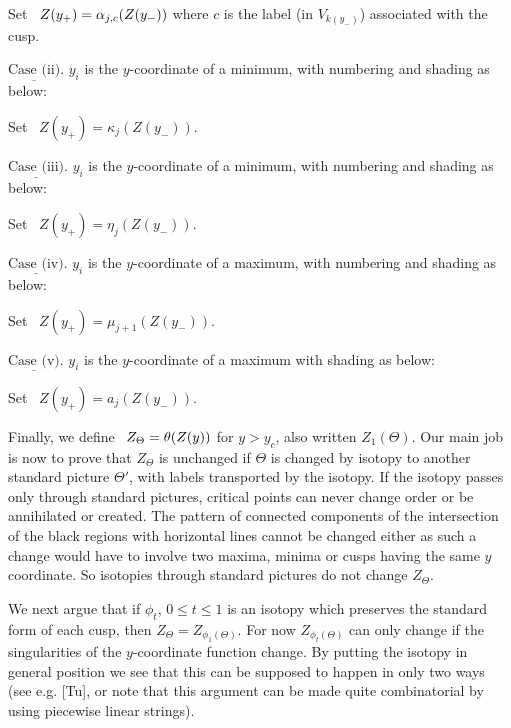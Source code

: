 \bs

\ni Set \ $Z(y_+)=\alpha_{j,c}(Z(y_-))$ where $c$ is the label
(in $V_{k(y_-)}$) associated with the cusp.

\bs ${\underline{\mbox{Case (ii)}}}$. $y_i$ is the
$y$-coordinate of a minimum, with numbering and shading as below:
\[
	
\]
\bs

\ni Set \ $Z(y_+)=\kappa_j(Z(y_-))$.

\newpage ${\underline{\mbox{Case (iii)}}}$. $y_i$ is the
$y$-coordinate of a minimum, with numbering and shading as below:
\[
	
\]

\bs

\ni Set \ $Z(y_+)=\eta_j(Z(y_-))$.


\bs ${\underline{\mbox{Case (iv)}}}$. $y_i$ is the
$y$-coordinate of a maximum, with numbering and shading as below:
\[
	
\]

\bs

\ni Set \ $Z(y_+)=\mu_{j+1}(Z(y_-))$.

\bs ${\underline{\mbox{Case (v)}}}$. $y_i$ is the
$y$-coordinate of a maximum  with shading as below:
\[
	
\]

\bs

\ni Set \ $Z(y_+)=a_j(Z(y_-))$.

\medskip
Finally, we define \ $Z_{\Theta}=\theta(Z(y))$ for $y > y_c$,
also written $Z_1(\Theta)$.
Our main job is now to prove that $Z_{\Theta}$ is unchanged if $\Theta$
is changed by isotopy to another standard picture $\Theta'$, with
labels transported by the isotopy. If the isotopy passes only
through standard pictures, critical points can never change order
or be annihilated or created. The pattern of connected components of
the intersection of the black regions with horizontal lines cannot
be changed either as such a change would have to involve two
maxima, minima or cusps having the same $y$ coordinate. So
isotopies through standard pictures do not change $Z_{\Theta}$.

We next argue that if $\phi_t$, $0\leq t\leq 1$ is an isotopy which
preserves the standard form of each cusp, then
$Z_{\Theta}=Z_{\phi_1(\Theta)}$. For now $Z_{\phi_t(\Theta)}$ can
only change if the singularities of the $y$-coordinate function
change. By putting the isotopy in general position we see that this
can be supposed to happen in only two ways (see e.g. [Tu], or
note that this argument can be made quite combinatorial by using
piecewise linear strings).



